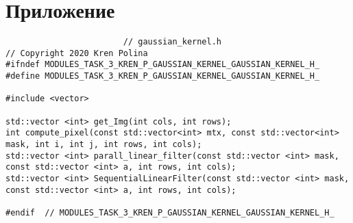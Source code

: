 \documentclass{report}
\begin{document}
\section*{Приложение}
\begin{lstlisting}
						// gaussian_kernel.h
// Copyright 2020 Kren Polina
#ifndef MODULES_TASK_3_KREN_P_GAUSSIAN_KERNEL_GAUSSIAN_KERNEL_H_
#define MODULES_TASK_3_KREN_P_GAUSSIAN_KERNEL_GAUSSIAN_KERNEL_H_

#include <vector>

std::vector <int> get_Img(int cols, int rows);
int compute_pixel(const std::vector<int> mtx, const std::vector<int> mask, int i, int j, int rows, int cols);
std::vector <int> parall_linear_filter(const std::vector <int> mask, const std::vector <int> a, int rows, int cols);
std::vector <int> SequentialLinearFilter(const std::vector <int> mask, const std::vector <int> a, int rows, int cols);

#endif  // MODULES_TASK_3_KREN_P_GAUSSIAN_KERNEL_GAUSSIAN_KERNEL_H_

\end{lstlisting}
\end{document}
